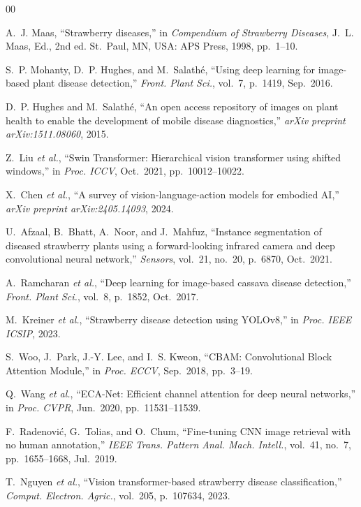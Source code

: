 \documentclass[conference]{IEEEtran}
\begin{document}
\begin{thebibliography}{00}

A.~J. Maas, ``Strawberry diseases,'' in \textit{Compendium of Strawberry Diseases}, J.~L. Maas, Ed., 2nd ed. St.~Paul, MN, USA: APS Press, 1998, pp.~1--10.

S.~P. Mohanty, D.~P. Hughes, and M.~Salathé, ``Using deep learning for image-based plant disease detection,'' \textit{Front. Plant Sci.}, vol.~7, p.~1419, Sep.~2016.

D.~P. Hughes and M.~Salathé, ``An open access repository of images on plant health to enable the development of mobile disease diagnostics,'' \textit{arXiv preprint arXiv:1511.08060}, 2015.

Z.~Liu \textit{et al.}, ``Swin Transformer: Hierarchical vision transformer using shifted windows,'' in \textit{Proc. ICCV}, Oct.~2021, pp.~10012--10022.

X.~Chen \textit{et al.}, ``A survey of vision-language-action models for embodied AI,'' \textit{arXiv preprint arXiv:2405.14093}, 2024.

U.~Afzaal, B.~Bhatt, A.~Noor, and J.~Mahfuz, ``Instance segmentation of diseased strawberry plants using a forward-looking infrared camera and deep convolutional neural network,'' \textit{Sensors}, vol.~21, no.~20, p.~6870, Oct.~2021.

A.~Ramcharan \textit{et al.}, ``Deep learning for image-based cassava disease detection,'' \textit{Front. Plant Sci.}, vol.~8, p.~1852, Oct.~2017.

M.~Kreiner \textit{et al.}, ``Strawberry disease detection using YOLOv8,'' in \textit{Proc. IEEE ICSIP}, 2023.

S.~Woo, J.~Park, J.-Y. Lee, and I.~S. Kweon, ``CBAM: Convolutional Block Attention Module,'' in \textit{Proc. ECCV}, Sep.~2018, pp.~3--19.

Q.~Wang \textit{et al.}, ``ECA-Net: Efficient channel attention for deep neural networks,'' in \textit{Proc. CVPR}, Jun.~2020, pp.~11531--11539.

F.~Radenović, G.~Tolias, and O.~Chum, ``Fine-tuning CNN image retrieval with no human annotation,'' \textit{IEEE Trans. Pattern Anal. Mach. Intell.}, vol.~41, no.~7, pp.~1655--1668, Jul.~2019.

T.~Nguyen \textit{et al.}, ``Vision transformer-based strawberry disease classification,'' \textit{Comput. Electron. Agric.}, vol.~205, p.~107634, 2023.


\end{thebibliography}
\end{document}
